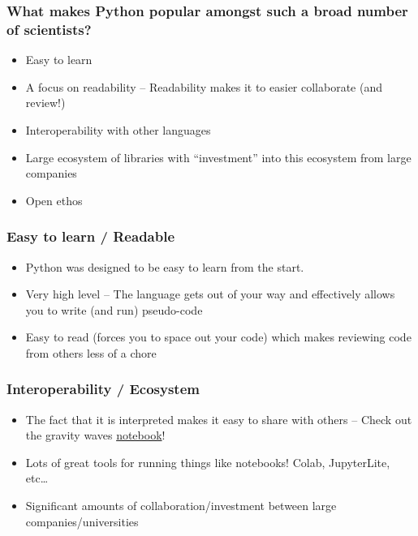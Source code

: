\documentclass[
    xcolor={svgnames,dvipsnames},
    hyperref={colorlinks, citecolor=DeepPink4, linkcolor=DarkRed, urlcolor=DarkBlue}
]{beamer}  %
\newcommand{\1}{\mathbbm 1}
\begin{document}
\begin{frame}
    \frametitle{What makes Python popular amongst such a broad number of scientists?}

    \begin{itemize}
        \item Easy to learn
        \item A focus on readability -- Readability makes it to easier collaborate (and review!)
        \item Interoperability with other languages
        \item Large ecosystem of libraries with ``investment'' into this ecosystem from large companies
        \item Open ethos
    \end{itemize}

\end{frame}

\begin{frame}
    \frametitle{Easy to learn / Readable}

    \begin{itemize}
        \item Python was designed to be easy to learn from the start.
        \item Very high level -- The language gets out of your way and effectively allows you to
            write (and run) pseudo-code
        \item Easy to read (forces you to space out your code) which makes reviewing code from
            others less of a chore
    \end{itemize}

\end{frame}

\begin{frame}
    \frametitle{Interoperability / Ecosystem}

    \begin{itemize}
        \item The fact that it is interpreted makes it easy to share with others -- Check out the
            gravity waves \href{https://gwosc.org/s/events/GW150914/GW150914_tutorial.html}{notebook}!
        \item Lots of great tools for running things like notebooks! Colab, JupyterLite, etc\dots
        \item Significant amounts of collaboration/investment between large companies/universities
    \end{itemize}

\end{frame}
\end{document}
